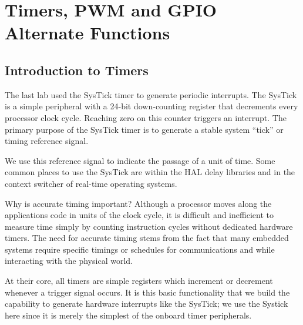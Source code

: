 \documentclass[openany,11pt,fleqn]{book} %
\begin{document}
	
\chapter{Timers, PWM and GPIO Alternate Functions}

\section{Introduction to Timers}
The last lab used the SysTick timer to generate periodic interrupts. The SysTick is a simple peripheral with a 24-bit down-counting register that decrements every processor clock cycle. Reaching zero on this counter triggers an interrupt. The primary purpose of the SysTick timer is to generate a stable system ``tick'' or timing reference signal. 

We use this reference signal to indicate the passage of a unit of time. Some common places to use the SysTick are within the HAL delay libraries and in the context switcher of real-time operating systems. 

Why is accurate timing important? Although a processor moves along the applications code in units of the clock cycle, it is difficult and inefficient to measure time simply by counting instruction cycles without dedicated hardware timers. The need for accurate timing stems from the fact that many embedded systems require specific timings or schedules for communications and while interacting with the physical world.

At their core, all timers are simple registers which increment or decrement whenever a trigger signal occurs. It is this basic functionality that we build the capability to generate hardware interrupts like the SysTick; we use the Systick here since it is merely the simplest of the onboard timer peripherals.
    
\end{document}
